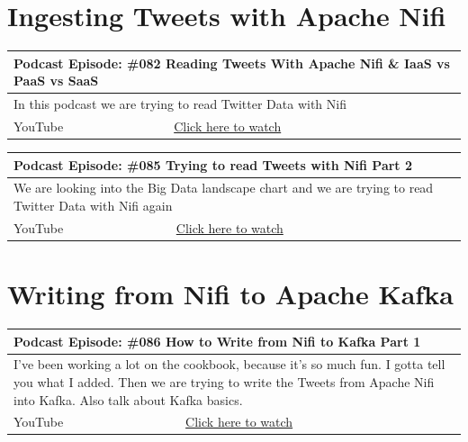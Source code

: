 \documentclass[12pt, numbers=noenddot]{scrreprt} %
\begin{document}
\chapter{Ingesting Tweets with Apache Nifi}

\begin{table}[h]
\begin{tabular}{ll}
\hline
\multicolumn{2}{l}{\textbf{Podcast Episode:} \#082 Reading Tweets With Apache Nifi \& IaaS vs PaaS vs SaaS} \\ \hline
\multicolumn{2}{p{15cm}}{In this podcast we are trying to read Twitter Data with Nifi}         \\ \hline
\multicolumn{1}{l|}{YouTube}   & \href{https://youtu.be/pWuT4UAocUY}{Click here to watch}   \\ \hline
\end{tabular}
\end{table}

\begin{table}[h]
\begin{tabular}{ll}
\hline
\multicolumn{2}{l}{\textbf{Podcast Episode:} \#085 Trying to read Tweets with Nifi Part 2} \\ \hline
\multicolumn{2}{p{15cm}}{We are looking into the Big Data landscape chart and we are trying to read Twitter Data with Nifi again}         \\ \hline
\multicolumn{1}{l|}{YouTube}   & \href{https://youtu.be/OLUwXr8-gAk}{Click here to watch}   \\ \hline
\end{tabular}
\end{table}


\chapter{Writing from Nifi to Apache Kafka}

\begin{table}[h]
\begin{tabular}{ll}
\hline
\multicolumn{2}{l}{\textbf{Podcast Episode:} \#086 How to Write from Nifi to Kafka Part 1} \\ \hline
\multicolumn{2}{p{15cm}}{I've been working a lot on the cookbook, because it's so much fun. I gotta tell you what I added.  Then we are trying to write the Tweets from Apache Nifi into Kafka. Also talk about Kafka basics.}         \\ \hline
\multicolumn{1}{l|}{YouTube}   & \href{https://youtu.be/F7Y-ygnyJMg}{Click here to watch}   \\  \hline
\end{tabular}
\end{table}
\end{document}
